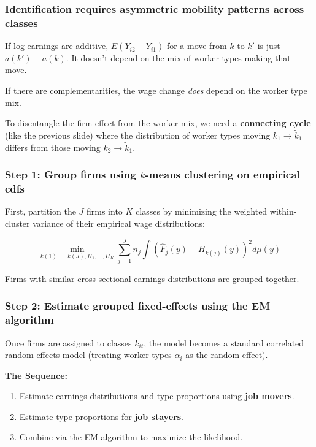 \begin{frame}
    \frametitle{Identification requires asymmetric mobility patterns across classes}
    
    If log-earnings are additive, $E(Y_{i2} - Y_{i1})$ for a move from $k$ to $k'$ is just $a(k') - a(k)$. It doesn't depend on the mix of worker types making that move.
    
    \vspace{0.5cm}
    If there are complementarities, the wage change \textit{does} depend on the worker type mix. 
    
    \vspace{0.5cm}
    To disentangle the firm effect from the worker mix, we need a \textbf{connecting cycle} (like the previous slide) where the distribution of worker types moving $k_1 \to \tilde{k}_1$ differs from those moving $k_2 \to \tilde{k}_1$.
\end{frame}

\begin{frame}
    \frametitle{Step 1: Group firms using $k$-means clustering on empirical cdfs}
    
    First, partition the $J$ firms into $K$ classes by minimizing the weighted within-cluster variance of their empirical wage distributions:
    
    \[ \min_{k(1), \dots, k(J), H_1, \dots, H_K} \sum_{j=1}^J n_j \int \left( \widehat{F}_j(y) - H_{k(j)}(y) \right)^2 d\mu(y) \]
    
    \vspace{0.5cm}
    Firms with similar cross-sectional earnings distributions are grouped together.
\end{frame}

\begin{frame}
    \frametitle{Step 2: Estimate grouped fixed-effects using the EM algorithm}
    
    Once firms are assigned to classes $k_{it}$, the model becomes a standard correlated random-effects model (treating worker types $\alpha_i$ as the random effect).
    
    \vspace{0.5cm}
    \textbf{The Sequence:}
    \begin{enumerate}
        \item Estimate earnings distributions and type proportions using \textbf{job movers}.
        \item Estimate type proportions for \textbf{job stayers}.
        \item Combine via the EM algorithm to maximize the likelihood.
    \end{enumerate}
\end{frame}

